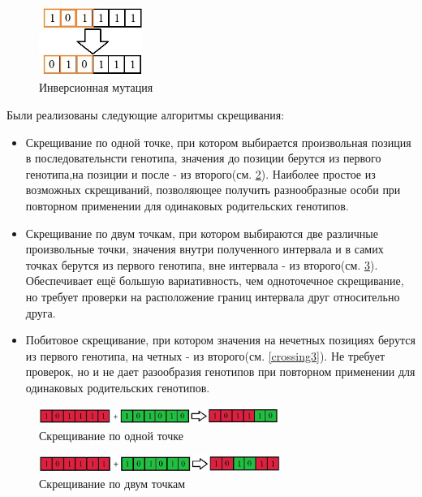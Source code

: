 	\begin{figure}[htbp]
	\includegraphics[width=0.3\textwidth]{./Pics/2.jpg}
		\caption{Инверсионная мутация}
	\label{mutation2}
	\end{figure}	
\FloatBarrier
 Были реализованы следующие алгоритмы скрещивания:
 \begin{itemize}
	\item Скрещивание по одной точке, при котором выбирается произвольная позиция в последовательнсти генотипа, значения до позиции берутся из первого генотипа,на позиции и после - из второго(см. \ref{crossing1}). Наиболее простое из возможных скрещиваний, позволяющее получить разнообразные особи при повторном применении для одинаковых родительских генотипов.
	\item Скрещивание по двум точкам, при котором выбираются две различные произвольные точки, значения внутри полученного интервала и в самих точках берутся из первого генотипа, вне интервала - из второго(см. \ref{crossing2}). Обеспечивает ещё большую вариативность, чем одноточечное скрещивание, но требует проверки на расположение границ интервала друг относительно друга.
	\item Побитовое скрещивание, при котором значения на нечетных позициях берутся из первого генотипа, на четных - из второго(см. \ref{crossing3}). Не требует проверок, но и не дает разообразия генотипов при повторном применении для одинаковых родительских генотипов.
 \end{itemize}
\FloatBarrier
	\begin{figure}[htbp]
	\includegraphics[width=0.7\textwidth]{./Pics/3.jpg}
	\caption{Скрещивание по одной точке}
	\label{crossing1}
\end{figure}

	\begin{figure}[htbp]
	\includegraphics[width=0.7\textwidth]{./Pics/4.jpg}
	\caption{Скрещивание по двум точкам}
	\label{crossing2}
\end{figure}


